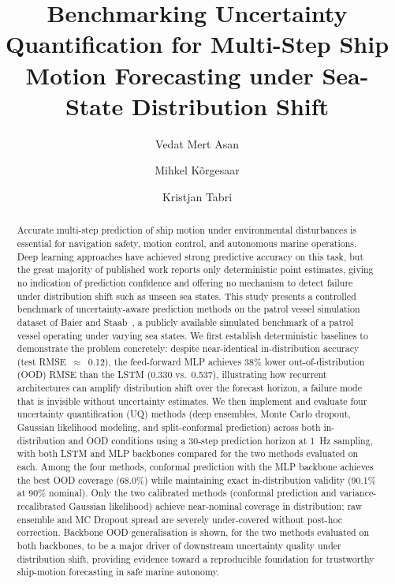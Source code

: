\documentclass[a4paper,fleqn]{cas-sc}
\begin{document}
\title{Benchmarking Uncertainty Quantification for Multi-Step Ship Motion Forecasting under Sea-State Distribution Shift}
\author[1]{Vedat Mert Asan}
\cormark[1]
\author[1]{Mihkel Kõrgesaar}
\author[1]{Kristjan Tabri}
\begin{abstract}
Accurate multi-step prediction of ship motion under environmental disturbances is essential for navigation safety, motion control, and autonomous marine operations. Deep learning approaches have achieved strong predictive accuracy on this task, but the great majority of published work reports only deterministic point estimates, giving no indication of prediction confidence and offering no mechanism to detect failure under distribution shift such as unseen sea states.
This study presents a controlled benchmark of uncertainty-aware prediction methods on the patrol vessel simulation dataset of Baier and Staab~\cite{baier2022darus}, a publicly available simulated benchmark of a patrol vessel operating under varying sea states. We first establish deterministic baselines to demonstrate the problem concretely: despite near-identical in-distribution accuracy (test RMSE~$\approx$~0.12), the feed-forward MLP achieves 38\% lower out-of-distribution (OOD) RMSE than the LSTM (0.330 vs.\ 0.537), illustrating how recurrent architectures can amplify distribution shift over the forecast horizon, a failure mode that is invisible without uncertainty estimates. We then implement and evaluate four uncertainty quantification (UQ) methods (deep ensembles, Monte Carlo dropout, Gaussian likelihood modeling, and split-conformal prediction) across both in-distribution and OOD conditions using a 30-step prediction horizon at 1~Hz sampling, with both LSTM and MLP backbones compared for the two methods evaluated on each.
Among the four methods, conformal prediction with the MLP backbone achieves the best OOD coverage (68.0\%) while maintaining exact in-distribution validity (90.1\% at 90\% nominal). Only the two calibrated methods (conformal prediction and variance-recalibrated Gaussian likelihood) achieve near-nominal coverage in distribution; raw ensemble and MC Dropout spread are severely under-covered without post-hoc correction. Backbone OOD generalisation is shown, for the two methods evaluated on both backbones, to be a major driver of downstream uncertainty quality under distribution shift, providing evidence toward a reproducible foundation for trustworthy ship-motion forecasting in safe marine autonomy.
\end{abstract}
\end{document}
